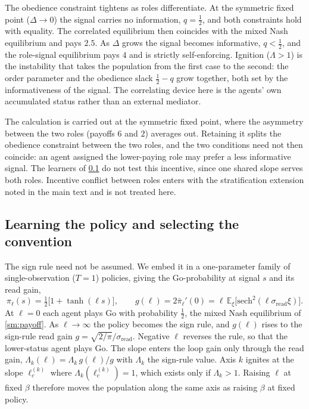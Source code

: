 \documentclass[
  aps,prx,
  preprint,
  superscriptaddress,
  nofootinbib
]{revtex4-2}
\newcommand{\sread}{\sigma_{\mathrm{read}}}
\newcommand{\pibar}{\bar\pi}
\newcommand{\gain}{g}
\begin{document}
The obedience constraint tightens as roles differentiate. At the symmetric fixed point ($\Delta\to0$) the signal carries no information, $q=\tfrac12$, and both constraints hold with equality. The correlated equilibrium then coincides with the mixed Nash equilibrium and pays $2.5$. As $\Delta$ grows the signal becomes informative, $q<\tfrac12$, and the role-signal equilibrium pays $4$ and is strictly self-enforcing. Ignition ($\Lambda>1$) is the instability that takes the population from the first case to the second: the order parameter and the obedience slack $\tfrac12-q$ grow together, both set by the informativeness of the signal. The correlating device here is the agents' own accumulated status rather than an external mediator.

The calculation is carried out at the symmetric fixed point, where the asymmetry between the two roles (payoffs $6$ and $2$) averages out. Retaining it splits the obedience constraint between the two roles, and the two conditions need not then coincide: an agent assigned the lower-paying role may prefer a less informative signal. The learners of \cref{sm:learn} do not test this incentive, since one shared slope serves both roles. Incentive conflict between roles enters with the stratification extension noted in the main text and is not treated here.

\subsection{Learning the policy and selecting the convention}\label{sm:learn}

\noindent The sign rule need not be assumed. We embed it in a one-parameter family of single-observation ($T=1$) policies, giving the Go-probability at signal $s$ and its read gain,
\begin{equation}\label{SM-eq:sm-learn-family}
\pi_\ell(s)=\tfrac12\bigl[1+\tanh(\ell s)\bigr],\qquad
\gain(\ell)=2\pibar_\ell'(0)=\ell\,\mathbb E_\xi\bigl[\mathrm{sech}^2(\ell\sread\xi)\bigr].
\end{equation}
At $\ell=0$ each agent plays Go with probability $\tfrac12$, the mixed Nash equilibrium of \cref{sm:payoff}. As $\ell\to\infty$ the policy becomes the sign rule, and $\gain(\ell)$ rises to the sign-rule read gain $\gain=\sqrt{2/\pi}/\sread$. Negative $\ell$ reverses the rule, so that the lower-status agent plays Go. The slope enters the loop gain only through the read gain, $\Lambda_k(\ell)=\Lambda_k\,\gain(\ell)/\gain$ with $\Lambda_k$ the sign-rule value. Axis $k$ ignites at the slope $\ell_c^{(k)}$ where $\Lambda_k(\ell_c^{(k)})=1$, which exists only if $\Lambda_k>1$. Raising $\ell$ at fixed $\beta$ therefore moves the population along the same axis as raising $\beta$ at fixed policy.
\end{document}
